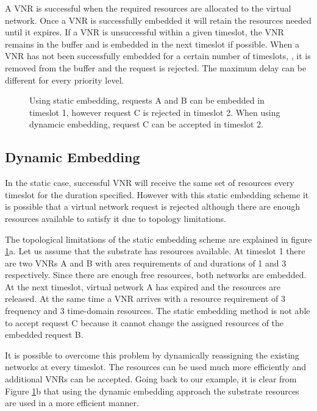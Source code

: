 \documentclass[conference]{IEEEtran}
\begin{document}
A VNR is successful when the required resources are allocated to the virtual network. Once a VNR is successfully embedded it will retain the resources needed until it expires. If a VNR is unsuccessful within a given timeslot, the VNR remains in the buffer and is embedded in the next timeslot if possible. When a VNR has not been successfully embedded for a certain number of timeslots, , it is removed from the buffer and the request is rejected. The maximum delay can be different for every priority level.

\begin{figure}[!t]
\centering
   \hfill
   \hfill
   \caption{Using static embedding, requests A and B can be embedded in timeslot 1, however request C is rejected in timeslot 2. When using dynamcic embedding, request C can be accepted in timeslot 2.}\label{fig:1}
\end{figure}

\subsection{Dynamic Embedding}

In the static case, successful VNR will receive the same set of resources every timeslot for the duration specified. However with this static embedding scheme it is possible that a virtual network request is rejected although there are enough resources available to satisfy it due to topology limitations.

The topological limitations of the static embedding scheme are explained in figure \ref{fig:1}a. Let us assume that the substrate has  resources available. At timeslot 1 there are two VNRs A and B with area requirements of  and durations of 1 and 3 respectively. Since there are enough free resources, both networks are embedded. At the next timeslot, virtual network A has expired and the resources are released. At the same time a VNR arrives with a resource requirement of 3 frequency and 3 time-domain resources. The static embedding method is not able to accept request C because it cannot change the assigned resources of the embedded request B.

It is possible to overcome this problem by dynamically reassigning the existing networks at every timeslot. The resources can be used much more efficiently and additional VNRs can be accepted. Going back to our example, it is clear from Figure \ref{fig:1}b that using the dynamic embedding approach the substrate resources are used in a more efficient manner.
\end{document}
